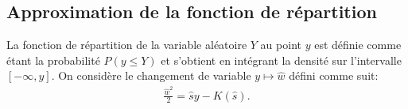 

\subsection{Approximation de la fonction de
  répartition}
\label{sec:appr-de-prem-1}

La fonction de répartition de la variable aléatoire $Y$ au point $y$
est définie comme étant la probabilité $P(y \leq Y)$ et s'obtient en
intégrant la densité sur l'intervalle $\left[ -\infty,y \right]$. On
considère le changement de variable $y \mapsto \hat{w}$ défini comme
suit:
\begin{align}
  \label{eq:chengementytow}
  \frac{\hat{w}^2}{2} = \hat{s} y - K(\hat{s}).
\end{align}

